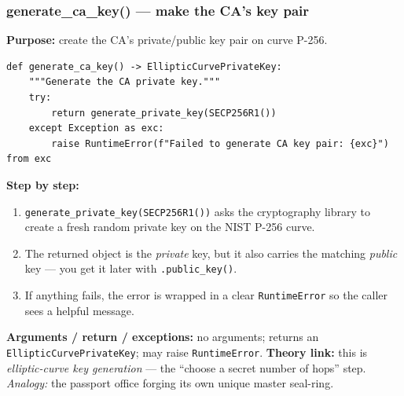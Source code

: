 \documentclass[11pt,a4paper]{article}
\begin{document}
\subsubsection*{generate\_ca\_key() --- make the CA's key pair}
\textbf{Purpose:} create the CA's private/public key pair on curve P-256.
\begin{lstlisting}[style=py,caption={ca/ca.py --- generate the CA key pair.}]
def generate_ca_key() -> EllipticCurvePrivateKey:
    """Generate the CA private key."""
    try:
        return generate_private_key(SECP256R1())
    except Exception as exc:
        raise RuntimeError(f"Failed to generate CA key pair: {exc}") from exc
\end{lstlisting}
\textbf{Step by step:}
\begin{enumerate}
  \item \texttt{generate\_private\_key(SECP256R1())} asks the cryptography
        library to create a fresh random private key on the NIST P-256 curve.
  \item The returned object is the \emph{private} key, but it also carries the
        matching \emph{public} key --- you get it later with
        \texttt{.public\_key()}.
  \item If anything fails, the error is wrapped in a clear \texttt{RuntimeError}
        so the caller sees a helpful message.
\end{enumerate}
\textbf{Arguments / return / exceptions:} no arguments; returns an
\texttt{EllipticCurvePrivateKey}; may raise \texttt{RuntimeError}.
\textbf{Theory link:} this is \emph{elliptic-curve key generation} --- the
``choose a secret number of hops'' step. \emph{Analogy:} the passport office
forging its own unique master seal-ring.
\end{document}
